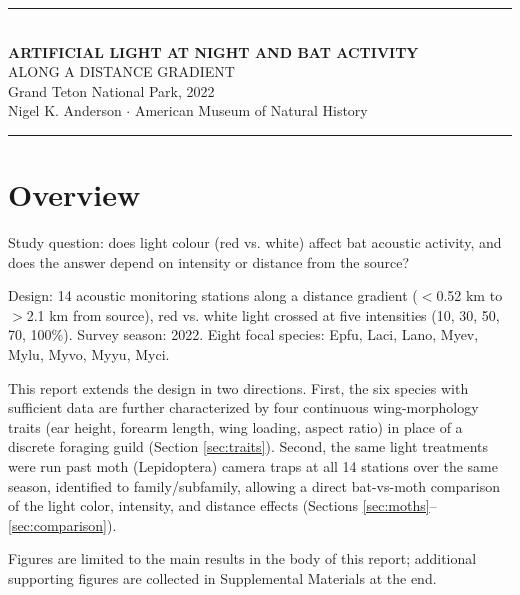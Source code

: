 \documentclass[11pt, letterpaper]{article}
\begin{document}

\begin{center}
\rule{\linewidth}{1pt}\\[0.4em]
{\large\bfseries ARTIFICIAL LIGHT AT NIGHT AND BAT ACTIVITY}\\
{\normalsize ALONG A DISTANCE GRADIENT}\\[0.3em]
{\small Grand Teton National Park, 2022}\\[0.2em]
{\small Nigel K. Anderson $\cdot$ American Museum of Natural History}\\[0.3em]
\rule{\linewidth}{1pt}
\end{center}

\vspace{0.5em}
\tableofcontents

\section{Overview}

Study question: does light colour (red vs. white) affect bat acoustic
activity, and does the answer depend on intensity or distance from the
source?

Design: 14 acoustic monitoring stations along a distance gradient
($<$0.52 km to $>$2.1 km from source), red vs. white light crossed
at five intensities (10, 30, 50, 70, 100\%). Survey season: 2022.
Eight focal species: Epfu, Laci, Lano, Myev, Mylu, Myvo, Myyu, Myci.

This report extends the design in two directions. First, the six
species with sufficient data are further characterized by four
continuous wing-morphology traits (ear height, forearm length, wing
loading, aspect ratio) in place of a discrete foraging guild (Section
\ref{sec:traits}). Second, the same light treatments were run past
moth (Lepidoptera) camera traps at all 14 stations over the same
season, identified to family/subfamily, allowing a direct bat-vs-moth
comparison of the light color, intensity, and distance effects
(Sections \ref{sec:moths}--\ref{sec:comparison}).

Figures are limited to the main results in the body of this report;
additional supporting figures are collected in Supplemental Materials
at the end.

\end{document}
